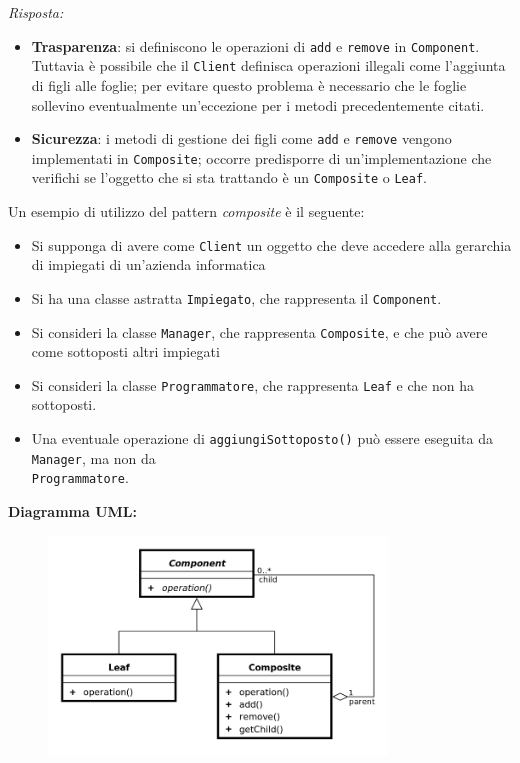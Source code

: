 \documentclass{article}
\newenvironment{solution}
    {\textit{Risposta:}}
    {}
\begin{document}
\begin{solution}
\begin{itemize}
\item \textbf{Trasparenza}: si definiscono le operazioni di \texttt{add} e \texttt{remove} in \texttt{Component}.
Tuttavia è possibile che il \texttt{Client} definisca operazioni illegali come l'aggiunta di figli alle foglie; per evitare questo problema è necessario che le foglie sollevino eventualmente un'eccezione per i metodi precedentemente citati.
	\item \textbf{Sicurezza}: i metodi di gestione dei figli come \texttt{add} e \texttt{remove} vengono implementati in \texttt{Composite}; occorre predisporre di un'implementazione che verifichi se l'oggetto che si sta trattando è un \texttt{Composite} o \texttt{Leaf}.
\end{itemize}
Un esempio di utilizzo del pattern \textit{composite} è il seguente:
\begin{itemize}
\item Si supponga di avere come \texttt{Client} un oggetto che deve accedere alla gerarchia di impiegati di un'azienda informatica
\item Si ha una classe astratta \texttt{Impiegato}, che rappresenta il \texttt{Component}.
\item Si consideri la classe \texttt{Manager}, che rappresenta \texttt{Composite}, e che può avere come sottoposti altri impiegati
\item Si consideri la classe \texttt{Programmatore}, che rappresenta \texttt{Leaf} e che non ha sottoposti.
\item Una eventuale operazione di \texttt{aggiungiSottoposto()} può essere eseguita da \texttt{Manager}, ma non da
\\
\texttt{Programmatore}.
\end{itemize}
\textbf{Diagramma UML:}
\begin{figure}[htb!]
	\centering
	\label{ObserverPattern}
	\includegraphics[width=9cm]{./immagini/compositePattern.png}
\end{figure}
\end{solution}
\end{document}
